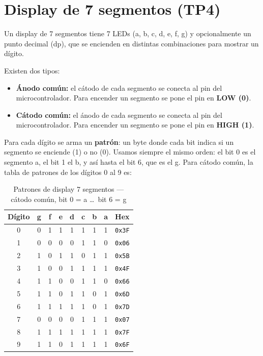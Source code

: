 \section{Display de 7 segmentos (TP4)}

Un display de 7 segmentos tiene 7 LEDs (a, b, c, d, e, f, g) y opcionalmente un
punto decimal (dp), que se encienden en distintas combinaciones para mostrar un
dígito.


Existen dos tipos:
\begin{itemize}
    \item \textbf{Ánodo común:} el cátodo de cada segmento se conecta al pin del
          microcontrolador. Para encender un segmento se pone el pin en \textbf{LOW (0)}.
    \item \textbf{Cátodo común:} el ánodo de cada segmento se conecta al pin del
          microcontrolador. Para encender un segmento se pone el pin en \textbf{HIGH (1)}.
\end{itemize}

Para cada dígito se arma un \textbf{patrón}: un byte donde cada bit indica si un
segmento se enciende (1) o no (0). Usamos siempre el mismo orden: el bit 0 es el
segmento a, el bit 1 el b, y así hasta el bit 6, que es el g. Para cátodo común, la
tabla de patrones de los dígitos 0 al 9 es:

\begin{table}[H]
\centering
\begin{tabular}{ccccccccc}
\toprule
\textbf{Dígito} & \textbf{g} & \textbf{f} & \textbf{e} & \textbf{d} &
\textbf{c} & \textbf{b} & \textbf{a} & \textbf{Hex} \\
\midrule
0 & 0 & 1 & 1 & 1 & 1 & 1 & 1 & \texttt{0x3F} \\
1 & 0 & 0 & 0 & 0 & 1 & 1 & 0 & \texttt{0x06} \\
2 & 1 & 0 & 1 & 1 & 0 & 1 & 1 & \texttt{0x5B} \\
3 & 1 & 0 & 0 & 1 & 1 & 1 & 1 & \texttt{0x4F} \\
4 & 1 & 1 & 0 & 0 & 1 & 1 & 0 & \texttt{0x66} \\
5 & 1 & 1 & 0 & 1 & 1 & 0 & 1 & \texttt{0x6D} \\
6 & 1 & 1 & 1 & 1 & 1 & 0 & 1 & \texttt{0x7D} \\
7 & 0 & 0 & 0 & 0 & 1 & 1 & 1 & \texttt{0x07} \\
8 & 1 & 1 & 1 & 1 & 1 & 1 & 1 & \texttt{0x7F} \\
9 & 1 & 1 & 0 & 1 & 1 & 1 & 1 & \texttt{0x6F} \\
\bottomrule
\end{tabular}
\caption{Patrones de display 7 segmentos --- cátodo común, bit 0 = a \ldots\ bit 6 = g}
\end{table}

